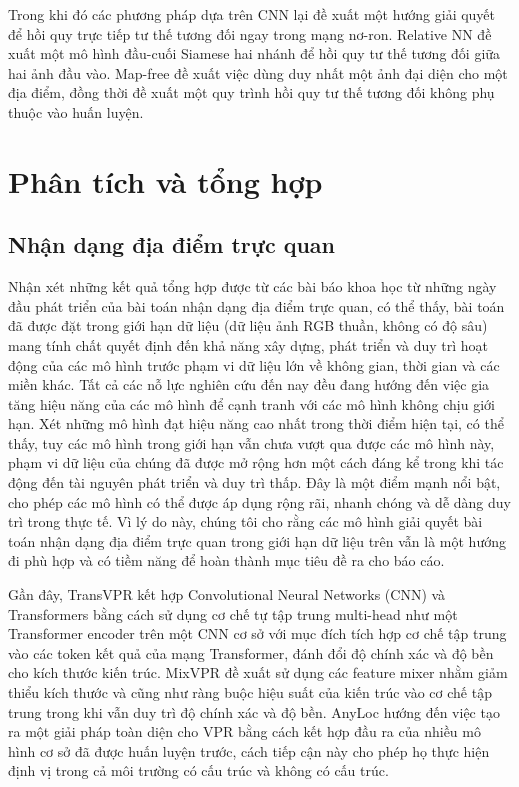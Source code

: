 Trong khi đó các phương pháp dựa trên CNN \cite{melekhov2017relative, saha2018improved, arnold2022mapfree} lại đề xuất một hướng giải quyết để hồi quy trực tiếp tư thế tương đối ngay trong mạng nơ-ron. Relative NN \cite{melekhov2017relative} đề xuất một mô hình đầu-cuối Siamese hai nhánh để hồi quy tư thế tương đối giữa hai ảnh đầu vào. Map-free \cite{arnold2022mapfree} đề xuất việc dùng duy nhất một ảnh đại diện cho một địa điểm, đồng thời đề xuất một quy trình hồi quy tư thế tương đối không phụ thuộc vào huấn luyện.

\section{Phân tích và tổng hợp}

\subsection*{Nhận dạng địa điểm trực quan}

Nhận xét những kết quả tổng hợp được từ các bài báo khoa học từ những ngày đầu phát triển của bài toán nhận dạng địa điểm trực quan, có thể thấy, bài toán đã được đặt trong giới hạn dữ liệu (dữ liệu ảnh RGB thuần, không có độ sâu) mang tính chất quyết định đến khả năng xây dựng, phát triển và duy trì hoạt động của các mô hình trước phạm vi dữ liệu lớn về không gian, thời gian và các miền khác. Tất cả các nỗ lực nghiên cứu đến nay đều đang hướng đến việc gia tăng hiệu năng của các mô hình để cạnh tranh với các mô hình không chịu giới hạn. Xét những mô hình đạt hiệu năng cao nhất trong thời điểm hiện tại, có thể thấy, tuy các mô hình trong giới hạn vẫn chưa vượt qua được các mô hình này, phạm vi dữ liệu của chúng đã được mở rộng hơn một cách đáng kể trong khi tác động đến tài nguyên phát triển và duy trì thấp. Đây là một điểm mạnh nổi bật, cho phép các mô hình có thể được áp dụng rộng rãi, nhanh chóng và dễ dàng duy trì trong thực tế. Vì lý do này, chúng tôi cho rằng các mô hình giải quyết bài toán nhận dạng địa điểm trực quan trong giới hạn dữ liệu trên vẫn là một hướng đi phù hợp và có tiềm năng để hoàn thành mục tiêu đề ra cho báo cáo. 

Gần đây, TransVPR \cite{wang2022transvpr} kết hợp Convolutional Neural Networks (CNN) và Transformers \cite{vaswani2023attention} bằng cách sử dụng cơ chế tự tập trung multi-head như một Transformer encoder trên một CNN cơ sở với mục đích tích hợp cơ chế tập trung vào các token kết quả của mạng Transformer, đánh đổi độ chính xác và độ bền cho kích thước kiến trúc. MixVPR \cite{alibey2023mixvpr} đề xuất sử dụng các feature mixer nhằm giảm thiểu kích thước và cũng như ràng buộc hiệu suất của kiến trúc vào cơ chế tập trung trong khi vẫn duy trì độ chính xác và độ bền. AnyLoc \cite{keetha2023anyloc} hướng đến việc tạo ra một giải pháp toàn diện cho VPR bằng cách kết hợp đầu ra của nhiều mô hình cơ sở đã được huấn luyện trước, cách tiếp cận này cho phép họ thực hiện định vị trong cả môi trường có cấu trúc và không có cấu trúc.

